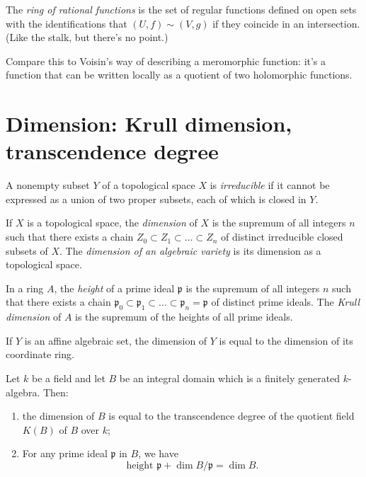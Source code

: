 \begin{definition}
\label{definition-rational-ring}
The {\it ring of rational
functions} is the set of regular functions
defined
on open sets with the identifications that
$(U,f)\sim(V,g)$
if they coincide in an intersection. (Like
the stalk,
but there's no point.)
\end{definition}

Compare this to Voisin's way of describing
a meromorphic function:
it's a function that can be written locally
as a quotient of two holomorphic functions.



\section{Dimension: Krull dimension,
transcendence degree}
\label{section-dimension}

\begin{definition}
\label{definition-irreducible-topological}
A nonempty subset $Y$ of a topological space
$X$
is {\it irreducible} if it cannot be
expressed
as a union of two proper subsets,
each of which is closed in $Y$.
\end{definition}

\begin{definition}
\label{definition-topol-space-dimen}
If $X$ is a topological space,
the {\it dimension} of $X$ is the supremum of
all integers $n$
such that there exists a chain
$Z_0 \subset Z_1\subset … \subset Z_n$
of distinct irreducible closed subsets of
$X$.
The {\it dimension of an algebraic variety}
is its dimension as a topological space.
\end{definition}

\begin{definition}
\label{definition-krull-dimension}
In a ring $A$, the {\it height} of a prime
ideal $\mathfrak{p}$
is the supremum of all integers $n$
such that there exists a chain
$\mathfrak{p}_0
\subset\mathfrak{p}
_1\subset…\subset\mathfrak{p}_n=\mathfrak{p}$
of distinct prime ideals.
The {\it Krull dimension} of $A$ is the
supremum of the heights
of all prime ideals.
\end{definition}

\begin{proposition}
\label{proposition-dimension}
If $Y$ is an affine algebraic set,
the dimension of $Y$ is equal to the
dimension
of its coordinate ring.
\end{proposition}

\begin{theorem}
\label{theorem-dimen-trans-degre}
Let $k$ be a field and let $B$ be an integral
domain
which is a finitely generated $k$-algebra.
Then:
\begin{enumerate}
\item the dimension of $B$ is equal to the
transcendence degree
of the quotient field $K(B)$ of $B$ over $k$;
\item For any prime ideal $\mathfrak{p}$ in
$B$, we have
$$
\text{height }\mathfrak{p}+ \dim B /
\mathfrak{p}=\dim B.
$$

\end{enumerate}
\end{theorem}

